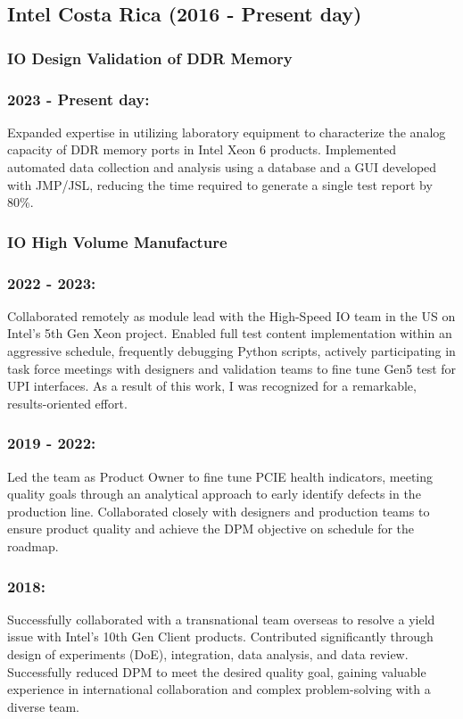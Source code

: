 \documentclass{article}
\begin{document}
\subsection{Intel Costa Rica (2016 - Present day)}
\subsubsection{IO Design Validation of DDR Memory}
\subsubsection{2023 - Present day:}
Expanded expertise in utilizing laboratory equipment to characterize the analog capacity of DDR memory ports in Intel Xeon 6 products. Implemented automated data collection and analysis using a database and a GUI developed with JMP/JSL, reducing the time required to generate a single test report by 80\%.
\subsubsection{IO High Volume Manufacture}
\subsubsection{2022 - 2023:}
Collaborated remotely as module lead with the High-Speed IO team in the US on Intel’s 5th Gen Xeon project. Enabled full test content implementation within an aggressive schedule, frequently debugging Python scripts, actively participating in task force meetings with designers and validation teams to fine tune Gen5 test for UPI interfaces. As a result of this work, I was recognized for a remarkable, results-oriented effort.
\subsubsection{2019 - 2022:}
Led the team as Product Owner to fine tune PCIE health indicators, meeting quality goals through an analytical approach to early identify defects in the production line. Collaborated closely with designers and production teams to ensure product quality and achieve the DPM objective on schedule for the roadmap.
\subsubsection{2018:}
Successfully collaborated with a transnational team overseas to resolve a yield issue with Intel’s 10th Gen Client products. Contributed significantly through design of experiments (DoE), integration, data analysis, and data review. Successfully reduced DPM to meet the desired quality goal, gaining valuable experience in international collaboration and complex problem-solving with a diverse team.
\end{document}
